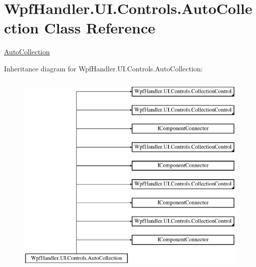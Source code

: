 \hypertarget{class_wpf_handler_1_1_u_i_1_1_controls_1_1_auto_collection}{}\section{Wpf\+Handler.\+U\+I.\+Controls.\+Auto\+Collection Class Reference}
\label{class_wpf_handler_1_1_u_i_1_1_controls_1_1_auto_collection}


\mbox{\hyperlink{class_wpf_handler_1_1_u_i_1_1_controls_1_1_auto_collection}{Auto\+Collection}}  


Inheritance diagram for Wpf\+Handler.\+U\+I.\+Controls.\+Auto\+Collection\+:\begin{figure}[H]
\begin{center}
\leavevmode
\includegraphics[height=10.000000cm]{d2/d28/class_wpf_handler_1_1_u_i_1_1_controls_1_1_auto_collection}
\end{center}
\end{figure}
